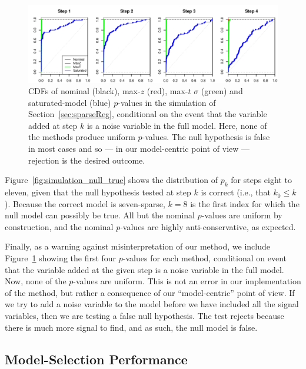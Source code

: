 \documentclass{article}
\begin{document}
\begin{figure}[h]
  \centering
  \includegraphics[width=1\textwidth]{figs/simulation_snr_5_alpha_05_noise_var.pdf}
  \caption{ CDFs of nominal (black), max-$z$ (red), max-$t$ $\sigma$ (green) and  saturated-model (blue) $p$-values in the simulation of Section~\ref{sec:sparseReg}, conditional on the event that the variable added at step $k$ is a noise variable in the full model. Here, none of the methods produce uniform $p$-values. The null hypothesis is false in most cases and so --- in our model-centric point of view --- rejection is the desired outcome.}
  \label{fig:simulation_noise_var}
\end{figure}

Figure~\ref{fig:simulation_null_true} shows the distribution of $p_k$ for steps eight to eleven, given that the null hypothesis tested at step $k$ is correct (i.e., that $k_0\leq k$). Because the correct model is seven-sparse, $k=8$ is the first index for which the null model can possibly be true. All but the nominal $p$-values are uniform by construction, and the nominal $p$-values are highly anti-conservative, as expected.

Finally, as a warning against misinterpretation of our method, we include Figure~\ref{fig:simulation_noise_var} showing the first four $p$-values for each method, conditional on event that the variable added at the given step is a noise variable in the full model. Now, none of the $p$-values are uniform. This is not an error in our implementation of the method, but rather a consequence of our ``model-centric'' point of view. If we try to add a noise variable to the model before we have included all the signal variables, then we are testing a false null hypothesis. The test rejects because there is much more signal to find, and as such, the null model is false.  

\subsection{Model-Selection Performance}
\end{document}

